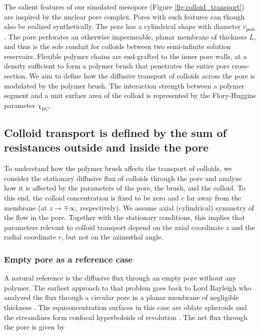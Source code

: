 \documentclass[12pt, a4paper]{article}
\begin{document}
The salient features of our simulated mesopore (Figure \ref{fig:colloid_transport}) are inspired by the nuclear pore complex.
Pores with such features can though also be realized synthetically.
The pore has a cylindrical shape with diameter $r_{\text{pore}}$.
The pore perforates an otherwise impermeable, planar membrane of thickness $L$, and thus is the sole conduit for colloids between two semi-infinite solution reservoirs.
Flexible polymer chains are end-grafted to the inner pore walls, at a density sufficient to form a polymer brush that penetrates the entire pore cross-section.
We aim to define how the diffusive transport of colloids across the pore is modulated by the polymer brush. 
The interaction strength between a polymer segment and a unit surface area of the colloid is represented by the Flory-Huggins parameter $\chi_{\text{PC}}$. 


\subsection{Colloid transport is defined by the sum of resistances outside and inside the pore}

To understand how the polymer brush affects the transport of colloids, we consider the stationary diffusive flux of colloids through the pore 
and analyze how it is affected by the parameters of the pore, the brush, and the colloid.
To this end, the colloid concentration is fixed to be zero and $c$ far away from the membrane (at $z\rightarrow\mp\infty$, respectively). 
We assume axial (cylindrical) symmetry of the flow in the pore. Together with the stationary conditions, 
this implies that parameters relevant to colloid transport depend on the axial coordinate $z$ and the radial coordinate $r$, but not on the azimuthal angle.

\subsubsection{Empty pore as a reference case}

A natural reference is the diffusive flux through an empty pore without any polymer. The earliest approach to that problem goes back to Lord Rayleigh 
who analyzed the flux through a circular pore in a planar membrane of negligible thickness \cite{Strutt1878}. 
The equiconcentration surfaces in this case are oblate spheroids and the streamlines form confocal hyperboloids of revolution \cite{Cooke1966}.
The net flux through the pore is given by
\end{document}
